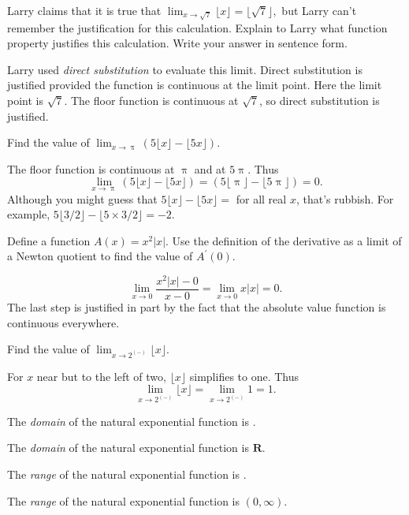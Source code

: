 \documentclass[12pt, answers,fleqn]{exam}
\newcommand{\reals}{\mathbf{R}}
\begin{document}
\large


\vspace{0.1in}

\begin{questions} 

    \large


\question Larry claims that it is true that
$\displaystyle
    \lim_{x \to \sqrt{7}} \lfloor x \rfloor = \lfloor \sqrt{7} \rfloor,
$
but Larry can't remember the justification for this calculation. Explain to 
Larry what function property justifies this calculation. Write your answer in
sentence form.
\begin{solution} Larry used \emph{direct substitution} to evaluate this limit. Direct
    substitution is justified provided the function is continuous at the limit 
    point.  Here the limit point is $\sqrt{7}$. The floor function is continuous 
    at $\sqrt{7}$, so direct substitution is justified.    
\end{solution}

\question Find the value of \(\displaystyle \lim_{x \to \uppi} 
\left(5 \lfloor x \rfloor -  \lfloor 5 x \rfloor  \right) \).
\begin{solution} The floor function is continuous at $\uppi$ and at $5 \uppi$. Thus
    \[
    \lim_{x \to \uppi} 
\left(5 \lfloor x \rfloor -  \lfloor 5 x \rfloor  \right) 
 = \left(5 \lfloor \uppi \rfloor -  \lfloor 5 \uppi \rfloor \right)
 = 0.
    \]
Although you might guess that $5 \lfloor x \rfloor -  \lfloor 5 x \rfloor = $
for all real $x$, that's rubbish. For example, 
$5 \lfloor 3/2 \rfloor -  \lfloor 5 \times 3/2 \rfloor = -2.$
\end{solution}

\question Define a function $A(x) = x^2 |x|$. Use the definition of
the derivative as a limit of a Newton quotient to find the value of $A^\prime(0)$.
\begin{solution}   
    \[
    \lim_{x \to 0} \frac{x^2 |x| - 0}{x-0} = \lim_{x \to 0} x |x| = 0.
    \]
The last step is justified in part by the fact that the absolute value
function is continuous everywhere.
\end{solution}
\question Find the value of \(\displaystyle \lim_{x \to 2^{(-)}} 
 \lfloor x \rfloor \).
\begin{solution}
For $x$ near but to the left of two, \(\lfloor x \rfloor \) simplifies
to one. Thus
\[
    \lim_{x \to 2^{(-)}}  \lfloor x \rfloor = \lim_{x \to 2^{(-)}} 1 = 1.
\]
\end{solution}
\question The \emph{domain} of the natural exponential function is \underline{\phantom{xxxxxxxxx}}.
\begin{solution}
    The \emph{domain} of the natural exponential function is $\reals$.
\end{solution}
\question The \emph{range} of the natural exponential function is  \underline{\phantom{xxxxxxxxx}}.
\begin{solution}
    The \emph{range} of the natural exponential function is $(0,\infty)$.
\end{solution}
    

\end{questions}
\end{document}
